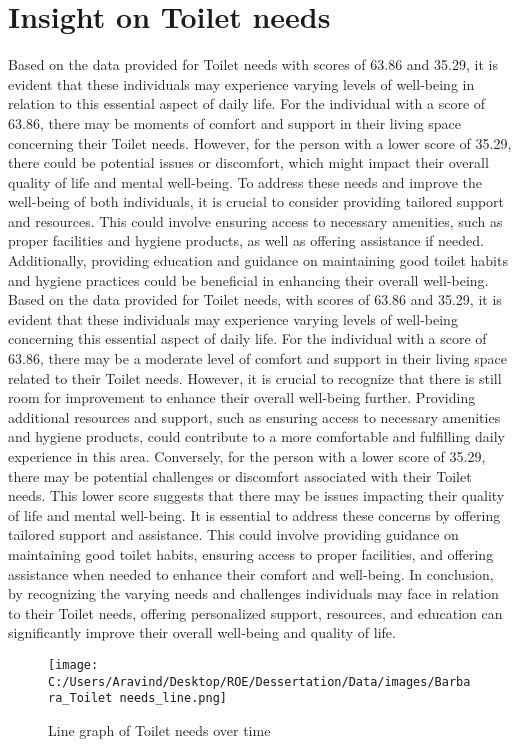 \documentclass[10pt, a4paper]{article}%
\begin{document}
\section{Insight on Toilet needs}%
\label{sec:InsightonToiletneeds}%
Based on the data provided for Toilet needs with scores of 63.86 and 35.29, it is evident that these individuals may experience varying levels of well{-}being in relation to this essential aspect of daily life.\newline%
\newline%
For the individual with a score of 63.86, there may be moments of comfort and support in their living space concerning their Toilet needs. However, for the person with a lower score of 35.29, there could be potential issues or discomfort, which might impact their overall quality of life and mental well{-}being.\newline%
\newline%
To address these needs and improve the well{-}being of both individuals, it is crucial to consider providing tailored support and resources. This could involve ensuring access to necessary amenities, such as proper facilities and hygiene products, as well as offering assistance if needed. Additionally, providing education and guidance on maintaining good toilet habits and hygiene practices could be beneficial in enhancing their overall well{-}being.\newline%
\newline%
Based on the data provided for Toilet needs, with scores of 63.86 and 35.29, it is evident that these individuals may experience varying levels of well{-}being concerning this essential aspect of daily life.\newline%
\newline%
For the individual with a score of 63.86, there may be a moderate level of comfort and support in their living space related to their Toilet needs. However, it is crucial to recognize that there is still room for improvement to enhance their overall well{-}being further. Providing additional resources and support, such as ensuring access to necessary amenities and hygiene products, could contribute to a more comfortable and fulfilling daily experience in this area.\newline%
\newline%
Conversely, for the person with a lower score of 35.29, there may be potential challenges or discomfort associated with their Toilet needs. This lower score suggests that there may be issues impacting their quality of life and mental well{-}being. It is essential to address these concerns by offering tailored support and assistance. This could involve providing guidance on maintaining good toilet habits, ensuring access to proper facilities, and offering assistance when needed to enhance their comfort and well{-}being.\newline%
\newline%
In conclusion, by recognizing the varying needs and challenges individuals may face in relation to their Toilet needs, offering personalized support, resources, and education can significantly improve their overall well{-}being and quality of life.%


\begin{figure}[H]%
\centering%
\texttt{[image: C:/Users/Aravind/Desktop/ROE/Dessertation/Data/images/Barbara\_Toilet needs\_line.png]}%
\caption{Line graph of Toilet needs over time}%
\end{figure}

%
\end{document}
